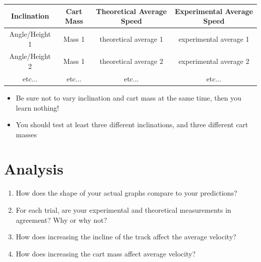 \documentclass{article}
\begin{document}
\begin{table}
	\centering
	\begin{tabular}{|c|c|c|c|}
		\hline
		\textbf{Inclination} & \textbf{Cart Mass} & \textbf{Theoretical Average Speed} & \textbf{Experimental Average Speed}\\
		\hline
		Angle/Height 1 & Mass 1 & theoretical average 1 & experimental average 1\\
		\hline 
		Angle/Height 2 & Mass 1 & theoretical average 2 & experimental average 2\\
		\hline
		etc... & etc... & etc... & etc... \\ \hline
	\end{tabular}
\end{table}

\begin{itemize}
	\item Be sure not to vary inclination and cart mass at the same time, then you learn nothing!
	\item You should test at least three different inclinations, and three different cart masses
\end{itemize}

\section*{Analysis}
\begin{enumerate}
	\item How does the shape of your actual graphs compare to your predictions?
	\item For each trial, are your experimental and theoretical measurements in agreement? Why or why not?
	\item How does increasing the incline of the track affect the average velocity?
	\item How does increasing the cart mass affect average velocity?
\end{enumerate}
\end{document}
